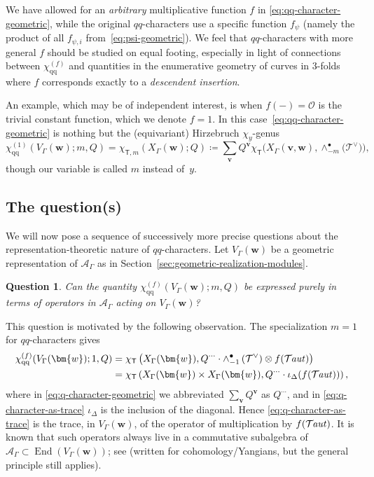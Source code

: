 \documentclass[10pt,a4paper]{amsart}
\numberwithin{equation}{section}
\newtheorem{question}[Theorem]{Question}
\renewcommand{\vec}[1]{\bm{#1}}
\newcommand{\cO}{\mathcal{O}}
\newcommand{\cT}{\mathcal{T}}
\newcommand{\kQ}{Q}
\newcommand{\sT}{\mathsf{T}}
\newcommand{\scA}{\mathscr{A}}
\newcommand{\chiqq}{\chi_{\mathrm{qq}}}
\DeclareMathOperator{\Taut}{\mathcal{T}\mkern-1.5mu{\mathit{aut}}}
\DeclareMathOperator{\End}{End}
\begin{document}
\begin{MyParagraph}
We have allowed for an {\it arbitrary} multiplicative function $f$ in
\eqref{eq:qq-character-geometric}, while the original $qq$-characters
use a specific function $f_{\psi}$ (namely the product of all
$f_{\psi,i}$ from~\eqref{eq:psi-geometric}). We feel that
$qq$-characters with more general $f$ should be studied on equal
footing, especially in light of connections \cite[Section~4.2]{Liu2021}
between $\chiqq^{(f)}$ and quantities in the enumerative geometry of
curves in $3$-folds where $f$ corresponds exactly to a {\it descendent
 insertion}.

An example, which may be of independent interest, is when $f(-) = \cO$
is the trivial constant function, which we denote $f = 1$. In this
case~\eqref{eq:qq-character-geometric} is nothing but the
(equivariant) Hirzebruch $\chi_y$-genus
\[ \chiqq^{(1)}(V_\Gamma(\vec w); m, \kQ) = \chi_{\sT,m}(X_\Gamma(\vec w); \kQ) \coloneqq \sum_{\vec v} \kQ^{\vec v} \chi_{\sT}\big(X_\Gamma(\vec v, \vec w), \wedge_{-m}^\bullet\big(\cT^\vee\big)\big), \]
though our variable is called $m$ instead of~$y$.
\end{MyParagraph}

\subsection{The question(s)}

\begin{MyParagraph}
We will now pose a sequence of successively more precise questions
about the re\-pre\-sen\-ta\-tion-theoretic nature of $qq$-characters. Let
$V_\Gamma(\vec w)$ be a geometric representation of $\scA_\Gamma$ as
in Section~\ref{sec:geometric-realization-modules}.

\begin{question}\label{q:0}
 Can the quantity $\chiqq^{(f)}(V_\Gamma(\vec w); m, \kQ)$ be expressed
 purely in terms of operators in $\scA_\Gamma$ acting on $V_\Gamma(\vec w)$?
\end{question}

This question is motivated by the following observation. The
specialization $m=1$ for $qq$-characters gives
\begin{align}
 \chiqq^{(f)}(V_\Gamma(\vec w); 1, \kQ)
 &= \chi_{\sT}\left(X_\Gamma(\vec w), \kQ^{\cdots} \cdot \wedge_{-1}^\bullet\left(\cT^\vee\right) \otimes f(\Taut)\right) \label{eq:q-character-geometric} \\
 &= \chi_{\sT}\left(X_\Gamma(\vec w) \times X_\Gamma(\vec w), \kQ^{\cdots} \cdot \iota_\Delta(f(\Taut))\right), \label{eq:q-character-as-trace}
\end{align}
where in \eqref{eq:q-character-geometric} we abbreviated $\sum_{\vec
 v} \kQ^{\vec v}$ as $\kQ^{\cdots}$, and in
\eqref{eq:q-character-as-trace} $\iota_\Delta$ is the inclusion of the
diagonal. Hence \eqref{eq:q-character-as-trace} is the trace, in
$V_\Gamma(\vec w)$, of the operator of multiplication by $f(\Taut)$. It is
known that such operators always live in a commutative subalgebra of
$\scA_\Gamma \subset \End(V_\Gamma(\vec w))$; see \cite[Section~5.4]{Maulik2019}
(written for cohomology/Yangians, but the general principle still
applies).
\end{MyParagraph}
\end{document}
